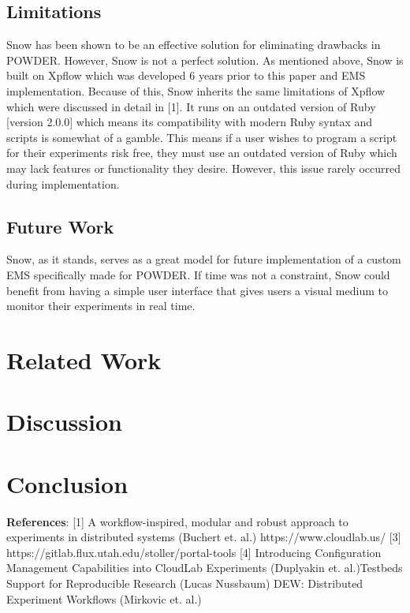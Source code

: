 \documentclass[12pt, letterpaper]{article}
\begin{document}
\begin{multicols}{2}
\subsection{Limitations} Snow has been shown to be an effective solution for eliminating drawbacks in POWDER.  However, Snow  is not a perfect solution.  As mentioned above, Snow is built on Xpflow which was developed 6 years prior to this paper and EMS implementation. Because of this, Snow inherits the same limitations of Xpflow which were discussed in detail in [1].  It runs on an outdated version of Ruby [version 2.0.0] which means its compatibility with modern Ruby syntax and scripts is somewhat of a gamble.  This means if a user wishes to program a script for their experiments risk free, they must use an outdated version of Ruby which may lack features or functionality they desire.   However, this issue rarely occurred during implementation.   \newline

\subsection{Future Work} Snow, as it stands, serves as a great model for future implementation of a custom EMS specifically made for POWDER.  If time was not a constraint, Snow could benefit from having a simple user interface that gives users a visual medium to monitor their experiments in real time.  

\section{Related Work}



\section{Discussion}
\section{Conclusion}
\textbf{References}: 
    [1] A workflow-inspired, modular and robust approach to experiments in distributed systems (Buchert et. al.)
\newline
    [2] https://www.cloudlab.us/
    [3] https://gitlab.flux.utah.edu/stoller/portal-tools
    [4] Introducing Configuration Management Capabilities into CloudLab Experiments (Duplyakin et. al.)\newline
    [5] Testbeds Support for Reproducible Research (Lucas Nussbaum) \newline
    [6] DEW: Distributed Experiment Workflows (Mirkovic et. al.)\newline

\end{multicols}
\end{document}
